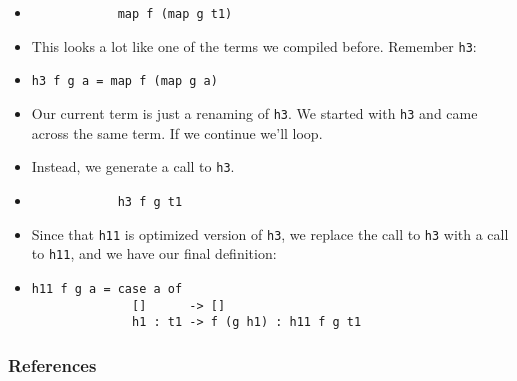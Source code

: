 \documentclass{beamer}
\begin{document}
\begin{frame}[fragile]

    \begin{itemize}[<+->]

        \item[]
            \begin{verbatim}
            map f (map g t1)
            \end{verbatim}

        \item[] This looks a lot like one of the terms we compiled before.
            Remember \texttt{h3}:

        \item[]
            \begin{verbatim}
h3 f g a = map f (map g a)
            \end{verbatim}

        \item[] Our current term is just a renaming of \texttt{h3}. We started
            with \texttt{h3} and came across the same term. If we continue we'll
            loop.

        \item[] Instead, we generate a call to \texttt{h3}.

        \item[]
            \begin{verbatim}
            h3 f g t1
            \end{verbatim}

        \item[] Since that \texttt{h11} is optimized version of \texttt{h3}, we
            replace the call to \texttt{h3} with a call to \texttt{h11}, and we
            have our final definition:

        \item[]
            \begin{verbatim}
h11 f g a = case a of
              []      -> []
              h1 : t1 -> f (g h1) : h11 f g t1
            \end{verbatim}

    \end{itemize}

\end{frame}

\begin{frame}[allowframebreaks]
    \frametitle{References}

    
    
\end{frame}
\end{document}
